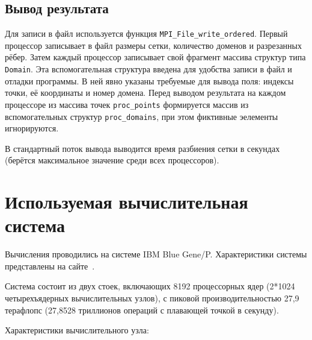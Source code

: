 \documentclass[oneside,final,14pt]{extreport}
\begin{document}
\section*{Вывод результата}

Для записи в файл используется функция \texttt{MPI\_File\_write\_ordered}.
Первый процессор записывает в файл размеры сетки, количество доменов и
разрезанных рёбер. Затем каждый процессор записывает свой фрагмент массива
структур типа \texttt{Domain}. Эта вспомогательная структура введена для
удобства записи в файл и отладки программы. В ней явно указаны требуемые для
вывода поля: индексы точки, её координаты и номер домена. Перед выводом
результата на каждом процессоре из массива точек \texttt{proc\_points}
формируется массив из вспомогательных структур \texttt{proc\_domains}, при этом
фиктивные эелементы игнорируются.

В стандартный поток вывода выводится время разбиения сетки в секундах
(берётся максимальное значение среди всех процессоров).

\chapter*{Используемая вычислительная система}

Вычисления проводились на системе IBM Blue Gene/P.
Характеристики системы представлены на сайте~\cite{bluegene}.

Система состоит из двух стоек, включающих 8192 процессорных ядер
(2*1024 четырехъядерных вычислительных узлов), с пиковой производительностью
27,9 терафлопс (27,8528 триллионов операций с плавающей точкой в секунду).

Характеристики вычислительного узла:
\end{document}
